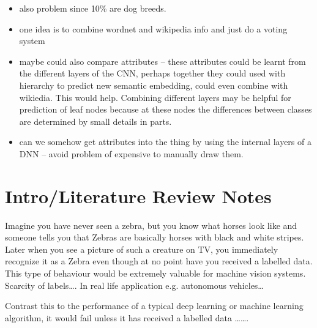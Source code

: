 \documentclass[12pt]{report}
\begin{document}
\begin{itemize}
    \item also problem since 10\% are dog breeds.
    \item one idea is to combine wordnet and wikipedia info and just do a voting system
    \item maybe could also compare attributes -- these attributes could be learnt from the different layers of the CNN, perhaps together they could used with hierarchy to predict new semantic embedding, could even combine with wikiedia. This would help. Combining different layers may be helpful for prediction of leaf nodes because at these nodes the differences between classes are determined by small details in parts.
    \item can we somehow get attributes into the thing by using the internal layers of a DNN -- avoid problem of expensive to manually draw them.
\end{itemize}

\chapter{Intro/Literature Review Notes}

Imagine you have never seen a zebra, but you know what horses look like and someone tells you that Zebras are basically horses with black and white stripes. Later when you see a picture of such a creature on TV, you immediately recognize it as a Zebra even though at no point have you received a labelled data. This type of behaviour would be extremely valuable for machine vision systems. Scarcity of labels\dots. In real life application e.g. autonomous vehicles\dots

Contrast this to the performance of a typical deep learning or machine learning algorithm, it would fail unless it has received a labelled data \dots\dots.
\end{document}
